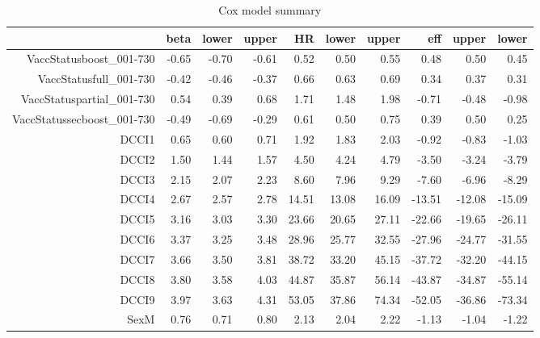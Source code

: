 \begin{table}[ht]
\centering
\begin{tabular}{rrrrrrrrrr}
  \hline
 & beta & lower & upper & HR & lower & upper & eff & upper & lower \\ 
  \hline
VaccStatusboost\_001-730 & -0.65 & -0.70 & -0.61 & 0.52 & 0.50 & 0.55 & 0.48 & 0.50 & 0.45 \\ 
  VaccStatusfull\_001-730 & -0.42 & -0.46 & -0.37 & 0.66 & 0.63 & 0.69 & 0.34 & 0.37 & 0.31 \\ 
  VaccStatuspartial\_001-730 & 0.54 & 0.39 & 0.68 & 1.71 & 1.48 & 1.98 & -0.71 & -0.48 & -0.98 \\ 
  VaccStatussecboost\_001-730 & -0.49 & -0.69 & -0.29 & 0.61 & 0.50 & 0.75 & 0.39 & 0.50 & 0.25 \\ 
  DCCI1 & 0.65 & 0.60 & 0.71 & 1.92 & 1.83 & 2.03 & -0.92 & -0.83 & -1.03 \\ 
  DCCI2 & 1.50 & 1.44 & 1.57 & 4.50 & 4.24 & 4.79 & -3.50 & -3.24 & -3.79 \\ 
  DCCI3 & 2.15 & 2.07 & 2.23 & 8.60 & 7.96 & 9.29 & -7.60 & -6.96 & -8.29 \\ 
  DCCI4 & 2.67 & 2.57 & 2.78 & 14.51 & 13.08 & 16.09 & -13.51 & -12.08 & -15.09 \\ 
  DCCI5 & 3.16 & 3.03 & 3.30 & 23.66 & 20.65 & 27.11 & -22.66 & -19.65 & -26.11 \\ 
  DCCI6 & 3.37 & 3.25 & 3.48 & 28.96 & 25.77 & 32.55 & -27.96 & -24.77 & -31.55 \\ 
  DCCI7 & 3.66 & 3.50 & 3.81 & 38.72 & 33.20 & 45.15 & -37.72 & -32.20 & -44.15 \\ 
  DCCI8 & 3.80 & 3.58 & 4.03 & 44.87 & 35.87 & 56.14 & -43.87 & -34.87 & -55.14 \\ 
  DCCI9 & 3.97 & 3.63 & 4.31 & 53.05 & 37.86 & 74.34 & -52.05 & -36.86 & -73.34 \\ 
  SexM & 0.76 & 0.71 & 0.80 & 2.13 & 2.04 & 2.22 & -1.13 & -1.04 & -1.22 \\ 
   \hline
\end{tabular}
\caption{Cox model summary} 
\end{table}
